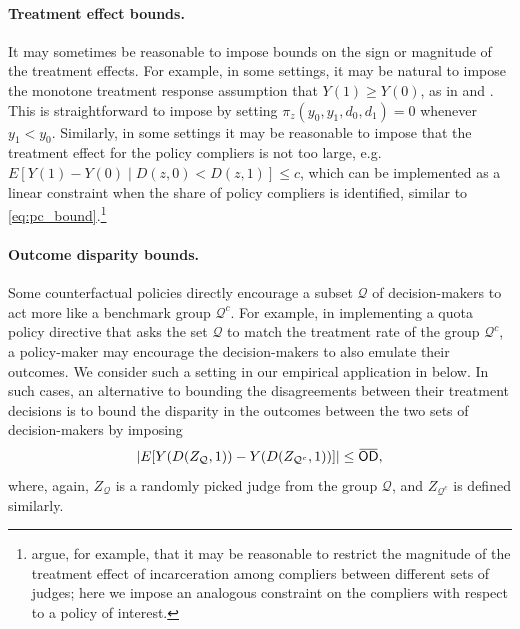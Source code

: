 \documentclass[12pt]{article}%
\theoremstyle{definition}
\DeclarePairedDelimiter\abs{\lvert}{\rvert}
\newcommand\1{\operatorname{I}\indicatorfence}
\newcommand{\overbar}[1]{\mkern 1.5mu\overline{\mkern-1.5mu#1\mkern-1.5mu}%
  \mkern 1.5mu}%
\newcommand{\OD}{\mathsf{OD}}
\begin{document}
\paragraph{Treatment effect bounds.} It may sometimes be reasonable to impose
bounds on the sign or magnitude of the treatment effects. For example, in some
settings, it may be natural to impose the monotone treatment response assumption
that $Y(1) \geq Y(0)$, as in \textcite{manski97} and
\textcite{machado_instrumental_2019}. This is straightforward to impose by
setting $\pi_{z}(y_0, y_1, d_0, d_1) =0$ whenever $y_1 < y_0$. Similarly, in
some settings it may be reasonable to impose that the treatment effect for the
policy compliers is not too large, e.g. $E[Y(1)-Y(0) \mid D(z,0)<D(z,1)] \leq c$, which can be
implemented as a linear constraint when the share of policy compliers is identified, similar to \cref{eq:pc_bound}.\footnote{\textcite{fll23} argue, for example,
  that it may be reasonable to restrict the magnitude of the treatment effect of
  incarceration among compliers between different sets of judges; here we impose
  an analogous constraint on the compliers with respect to a policy of
  interest.}

\paragraph{Outcome disparity bounds.} Some counterfactual policies directly
encourage a subset $\mathcal{Q}$ of decision-makers to act more like a benchmark
group $\mathcal{Q}^{c}$. For example, in implementing a quota policy directive
that asks the set $\mathcal{Q}$ to match the treatment rate of the group
$\mathcal{Q}^{c}$, a policy-maker may encourage the decision-makers to also
emulate their outcomes. We consider such a setting in our empirical application
in  below. In such cases, an alternative to bounding
the disagreements between their treatment decisions is to bound the disparity in
the outcomes between the two sets of decision-makers by imposing
\begin{equation}\label{eq:od}
  \abs{E[Y(D(Z_{\mathcal{Q}}, 1))-Y(D(Z_{\mathcal{Q}^{c}}, 1))]}\leq \overbar{\OD},
\end{equation}
where, again, $Z_{\mathcal{Q}}$ is a randomly picked judge from the group $\mathcal{Q}$, and ${Z}_{\mathcal{Q}^{c}}$ is defined similarly.
\end{document}
